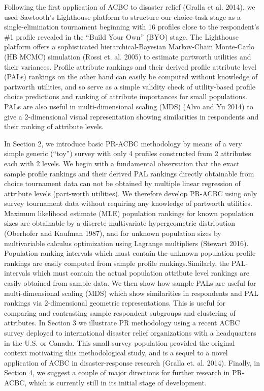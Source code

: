 \documentclass[a4paper, 12pt]{article}
\begin{document}
  Following the first application of ACBC to disaster relief (Gralla et al. 2014), we used Sawtooth's Lighthouse platform to structure our choice-task stage as a single-elimination tournament beginning with 16 profiles close to the respondent's \#1 profile revealed in the  ``Build Your Own'' (BYO) stage. The Lighthouse platform  offers  a sophisticated hierarchical-Bayesian Markov-Chain Monte-Carlo (HB MCMC) simulation (Rossi et. al. 2005) to estimate partworth utilities and their variances. Profile attribute rankings and their derived  profile attribute level (PALs) rankings on the other hand can easily be computed without knowledge of partworth utilities, and so serve as a simple validity check of utility-based  profile choice predictions and ranking of attribute importances for small populations.  PALs are also useful in  multi-dimensional scaling (MDS) (Alvo and Yu 2014) to give a 2-dimensional visual representation showing similarities in respondents and their ranking of attribute levels.

In Section 2, we introduce basic PR-ACBC methodology by means of a very simple generic (``toy'') survey with only 4 profiles constructed from 2 attributes each with 2 levels. We begin with a fundamental observation that the exact sample profile rankings and their derived PAL rankings directly obtainable from choice tournament data can not be obtained by multiple linear regression of attribute levels (part-worth utilities).  We therefore develop PR-ACBC using only survey tournament data without requiring any knowledge of partworth utilities.  Maximum likelihood estimate (MLE) population rankings for known population sizes are obtainable by a discrete multivariate hypergeometric distribution (Oberhofer and Kaufman 1987), and  for unknown population sizes by multivariable calculus optimization using Lagrange multipliers (Stewart 2016).   Population ranking intervals which must contain the unknown population profile rankings are easily computed from sample profile rankings.Similarly, the PAL-intervals which must contain the actual population attribute level rankings are easily obtained from sample data.   We then show how sample PALs are useful for multi-dimensional scaling (MDS) which show similarities in respondents and PAL rankings via 2-dimensional geometric representations. This is useful for comparing and contrasting sample respondent subgroups and clustering of attributes.  In Section 3 we illustrate PR methodology using a recent ACBC survey deployed to international disaster relief organizations with a headquarters in the U.S. or Canada.    This small survey population provided the original context motivating this methodological study, and is a sequel to a novel application of ACBC in disaster-response research (Gralla et. al. 2014).   Finally, in Section 4, we suggest a couple of major directions for further research in PR-ACBC, which is currently still in its initial stage of development.
\end{document}
